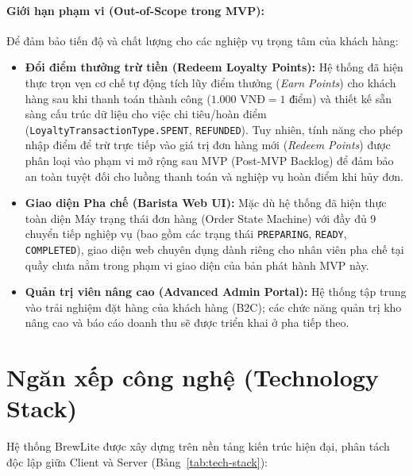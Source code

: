 \documentclass[12pt,a4paper,oneside]{report}
\begin{document}
\paragraph{Giới hạn phạm vi (Out-of-Scope trong MVP):}
Để đảm bảo tiến độ và chất lượng cho các nghiệp vụ trọng tâm của khách hàng:
\begin{itemize}
    \item \textbf{Đổi điểm thưởng trừ tiền (Redeem Loyalty Points):} Hệ thống đã hiện thực trọn vẹn cơ chế tự động tích lũy điểm thưởng (\textit{Earn Points}) cho khách hàng sau khi thanh toán thành công (\(1.000 \text{ VNĐ} = 1 \text{ điểm}\)) và thiết kế sẵn sàng cấu trúc dữ liệu cho việc chi tiêu/hoàn điểm (\texttt{LoyaltyTransactionType.SPENT}, \texttt{REFUNDED}). Tuy nhiên, tính năng cho phép nhập điểm để trừ trực tiếp vào giá trị đơn hàng mới (\textit{Redeem Points}) được phân loại vào phạm vi mở rộng sau MVP (Post-MVP Backlog) để đảm bảo an toàn tuyệt đối cho luồng thanh toán và nghiệp vụ hoàn điểm khi hủy đơn.
    \item \textbf{Giao diện Pha chế (Barista Web UI):} Mặc dù hệ thống đã hiện thực toàn diện Máy trạng thái đơn hàng (Order State Machine) với đầy đủ 9 chuyển tiếp nghiệp vụ (bao gồm các trạng thái \texttt{PREPARING}, \texttt{READY}, \texttt{COMPLETED}), giao diện web chuyên dụng dành riêng cho nhân viên pha chế tại quầy chưa nằm trong phạm vi giao diện của bản phát hành MVP này.
    \item \textbf{Quản trị viên nâng cao (Advanced Admin Portal):} Hệ thống tập trung vào trải nghiệm đặt hàng của khách hàng (B2C); các chức năng quản trị kho nâng cao và báo cáo doanh thu sẽ được triển khai ở pha tiếp theo.
\end{itemize}

\section{Ngăn xếp công nghệ (Technology Stack)}
Hệ thống BrewLite được xây dựng trên nền tảng kiến trúc hiện đại, phân tách độc lập giữa Client và Server (Bảng~\ref{tab:tech-stack}):
\end{document}
